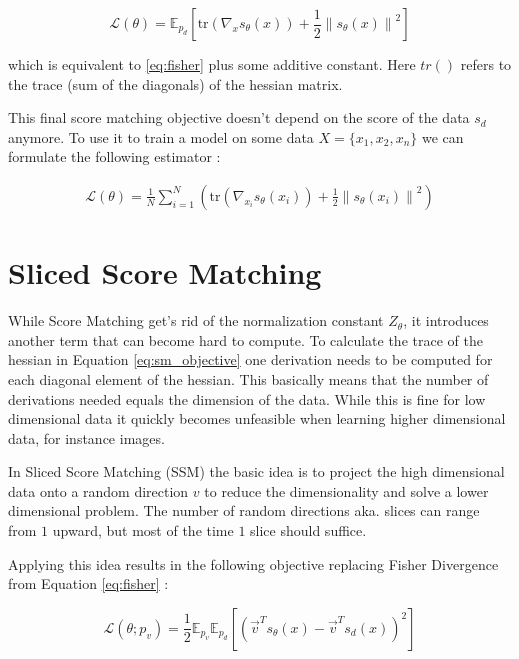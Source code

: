 \begin{equation}
    \mathcal{L}(\theta) = \mathbb{E}_{p_d} \left[\text{tr} \left( \nabla_x s_\theta(x) \right) + \frac{1}{2} \left\| s_\theta(x) \right\|^2 \right]
\end{equation}

which is equivalent to \ref{eq:fisher} plus some additive constant. Here $tr()$ refers to the
trace (sum of the diagonals) of the hessian matrix.
 
This final score matching objective doesn't depend on the score of the data $s_d$ anymore. To use it to train a model on some 
data $X = \{x_1, x_2, x_n\}$ we can formulate the following estimator \cite{sm}: 

\begin{align}
    \label{eq:sm_objective}
    \mathcal{L}(\theta) = \frac{1}{N} \sum_{i=1}^{N} \left(\text{tr} \left( \nabla_{x_i} s_\theta(x_i) \right) + \frac{1}{2} \left\| s_\theta(x_i) \right\|^2 \right)
\end{align}

\section{Sliced Score Matching}
\label{sec:ssm}

While Score Matching get's rid of the normalization constant $Z_\theta$, it introduces another term that can become hard
to compute. To calculate the trace of the hessian in Equation \ref{eq:sm_objective} one derivation needs to be computed for each diagonal element of the hessian.
This basically means that the number of derivations needed equals the dimension of the data. 
While this is fine for low dimensional data it quickly becomes unfeasible when
learning higher dimensional data, for instance images.  

In Sliced Score Matching (SSM) \cite{ssm} the basic idea is to project the high dimensional data onto a random direction $v$ to reduce 
the dimensionality and solve a lower dimensional problem. The number of random directions aka. slices can range from $1$ upward, but 
most of the time $1$ slice should suffice. 

Applying this idea results in the following objective replacing Fisher Divergence from Equation \ref{eq:fisher} \cite{ssm}: 

\begin{equation}
    \label{eq:ssm}
    \mathcal{L}(\theta; p_v) = \frac{1}{2} \mathbb{E}_{p_v} \mathbb{E}_{p_d} \left[ \left( \vec{v}^T s_\theta(x) - \vec{v}^T s_d(x) \right)^2 \right]
\end{equation}

